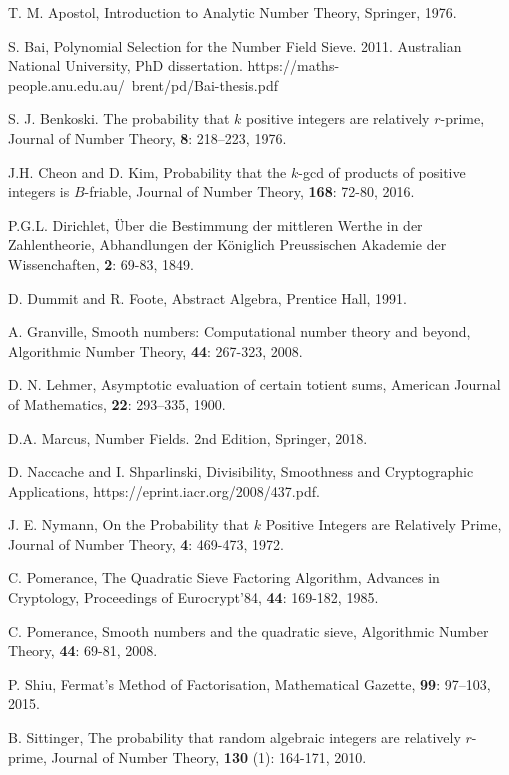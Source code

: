 \documentclass[12pt]{amsart}
\theoremstyle{definition}
\begin{document}

\newpage

\begin{thebibliography}{1}

 T. M. Apostol, Introduction to Analytic Number Theory, Springer, 1976.

 S. Bai, Polynomial Selection for the Number Field Sieve. 2011. Australian National University, PhD dissertation. https://maths-people.anu.edu.au/~brent/pd/Bai-thesis.pdf

 S. J. Benkoski. The probability that $k$ positive integers are relatively $r$-prime, Journal of Number Theory, \textbf{8}: 218–223, 1976.

 J.H. Cheon and D. Kim, Probability that the $k$-gcd of products of positive integers is $B$-friable, Journal of Number Theory, \textbf{168}: 72-80, 2016.

 P.G.L. Dirichlet, \"{U}ber die Bestimmung der mittleren Werthe in der Zahlentheorie, Abhandlungen der K\"{o}niglich Preussischen Akademie der Wissenchaften, \textbf{2}: 69-83, 1849.

 D. Dummit and R. Foote, Abstract Algebra, Prentice Hall, 1991.

 A. Granville, Smooth numbers: Computational number theory and beyond, Algorithmic Number Theory, \textbf{44}: 267-323, 2008.

 D. N. Lehmer, Asymptotic evaluation of certain totient sums, American Journal of Mathematics, \textbf{22}: 293–335, 1900.

 D.A. Marcus, Number Fields. 2nd Edition, Springer, 2018.

 D. Naccache and I. Shparlinski, Divisibility, Smoothness and Cryptographic Applications,
https://eprint.iacr.org/2008/437.pdf. 

 J. E. Nymann, On the Probability that $k$ Positive Integers are Relatively Prime, Journal of Number Theory, \textbf{4}: 469-473, 1972.

 C. Pomerance, The Quadratic Sieve Factoring Algorithm, Advances in Cryptology, Proceedings of Eurocrypt’84, \textbf{44}: 169-182, 1985.

 C. Pomerance, Smooth numbers and the quadratic sieve, Algorithmic Number Theory, \textbf{44}: 69-81, 2008.

 P. Shiu, Fermat’s Method of Factorisation, Mathematical Gazette, \textbf{99}: 97–103, 2015.

 B. Sittinger, The probability that random algebraic integers are relatively $r$-prime, Journal of Number Theory, \textbf{130} (1): 164-171, 2010.


\end{thebibliography}
\end{document}
